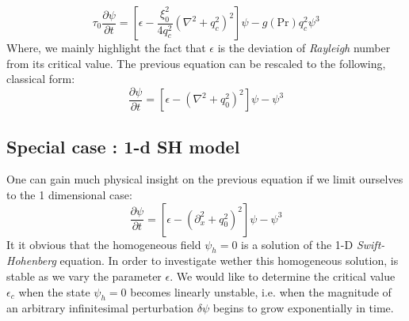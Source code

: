 \documentclass[11pt]{article}
\begin{document}
\begin{equation}
    \tau_0 \frac{\partial \psi}{\partial t} = \left[ \epsilon - \frac{\xi_0^2}{4q_c^2} \left( \nabla^2 + q_c^2 \right)^2 \right] \psi - g(\text{Pr}) q_c^2 \psi^3
\end{equation}
Where, we mainly highlight the fact that $\epsilon$ is the deviation of \emph{Rayleigh} number from its critical value. The previous equation can be rescaled to the following, classical form:
\begin{equation}
    \frac{\partial \psi}{\partial t} = \left[ \epsilon - \left( \nabla^2 + q_0^2 \right)^2 \right] \psi -  \psi^3
\end{equation}
\subsection{Special case : 1-d SH model}
One can gain much physical insight on the previous equation if we limit ourselves to the 1 dimensional case:
\begin{equation}
    \frac{\partial \psi}{\partial t} = \left[ \epsilon - \left( \partial_x^2 + q_0^2 \right)^2 \right] \psi -  \psi^3
\end{equation}
It it obvious that the homogeneous field $\psi_h=0$ is a solution of the 1-D \emph{Swift-Hohenberg} equation. In order to investigate wether this homogeneous solution, is stable as we vary the parameter $\epsilon$. We would like to determine the critical value $\epsilon_c$ when the state $\psi_h=0$ becomes linearly unstable, i.e. when the magnitude of an arbitrary infinitesimal perturbation $\delta\psi$ begins to grow exponentially in time.\\
\end{document}
